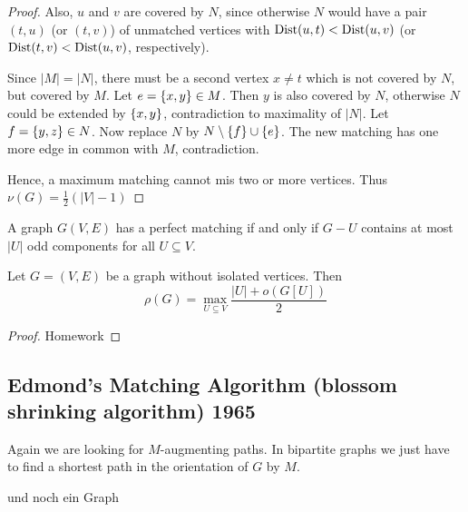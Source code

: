 \begin{proof}
	Also, $u$ and $v$ are covered by $N$, since otherwise $N$ would have a pair
	$(t,u)$ (or $(t,v)$) of unmatched vertices with $\operatorname{Dist}(u,t) < \operatorname{Dist} (u,v)$ 
	(or $\operatorname{Dist}(t,v) < \operatorname{Dist}(u,v)$, respectively).
	
	Since $|M| = |N|$, there must be a second vertex $x\neq t$ which is not
	covered by $N$, but covered by $M$. Let $e=\left\{x,y\right\} \in M$. Then $y$ is
	also covered by $N$, otherwise $N$ could be extended by $\left\{x,y\right\}$, 
	contradiction to maximality of $|N|$. Let $f=\left\{y,z\right\}\in N$. Now
	replace $N$ by $N \setminus \left\{f\right\} \cup \left\{e\right\}$. The new matching 
	has one more edge in common with $M$, contradiction.
	
	Hence, a maximum matching cannot mis two or more vertices. Thus $\nu (G) = 
	\frac12(|V|-1)$
	
\end{proof}

\begin{cor}
	A graph $G(V,E)$ has a perfect matching if and only if $G - U$ contains at
	most $|U|$ odd components for all $U \subseteq V$.
\end{cor}

\begin{cor}
	Let $G = (V,E)$ be a graph without isolated vertices. Then \[
		\rho(G) = \max_{U \subseteq V} \frac{|U| + o(G[U])}2
	\]
\end{cor}

\begin{proof}
	Homework
\end{proof}

\subsection*{Edmond's Matching Algorithm (blossom shrinking algorithm) 1965}
	Again we are looking for $M$-augmenting paths. In bipartite graphs we just have 
	to find a shortest path in the orientation of $G$ by $M$. 
	
\begin{xmp+}
und noch ein Graph
\end{xmp+}

